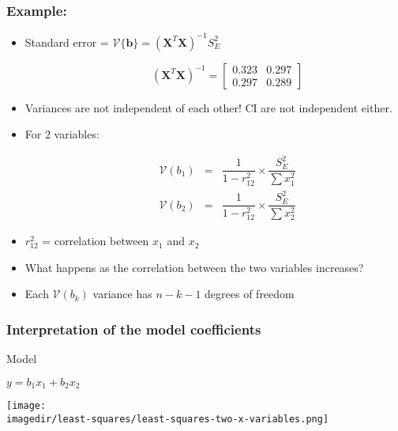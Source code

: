 \begin{frame}\frametitle{Example: {\color{myOrange}{600-level students self-study}}}
	\begin{itemize}
		\item	Standard error = $\mathcal{V}\{\mathbf{b}\} = \left( \mathbf{X}^T\mathbf{X} \right)^{-1} S_E^2$
	\end{itemize}

	$$ \qquad\qquad \left(\mathbf{X}^T\mathbf{X}\right)^{-1}=
	\begin{bmatrix}
		0.323 & 0.297 \\
		0.297 & 0.289
	\end{bmatrix}
	$$
	\begin{itemize}
		\item	Variances are not independent of each other! CI are not independent either.
		\item	For 2 variables:
	\end{itemize}

	$$
	\begin{array}{lcr}
		\qquad\qquad \mathcal{V}\left(b_1\right) &=& \dfrac{1}{1-r^2_{12}} \times \dfrac{S_E^2}{\sum{x_1^2}} \\
		\qquad\qquad \mathcal{V}\left(b_2\right) &=& \dfrac{1}{1-r^2_{12}} \times \dfrac{S_E^2}{\sum{x_2^2}}
	\end{array}
	$$
	\begin{itemize}
		\item	$r^2_{12}$ = correlation between $x_1$ and $x_2$
		\item	What happens as the correlation between the two variables increases?
		\item	Each $\mathcal{V}\left(b_k\right)$ variance has $n-k-1$ degrees of freedom
	\end{itemize}
\end{frame}

\begin{frame}\frametitle{Interpretation of the model coefficients}
	\begin{block}{Model}
		\begin{center}
			$y = b_1x_1 + b_2x_2$
		\end{center}
	\end{block}
	\begin{center}
		\texttt{[image: \\imagedir/least-squares/least-squares-two-x-variables.png]}
	\end{center}
\end{frame}


